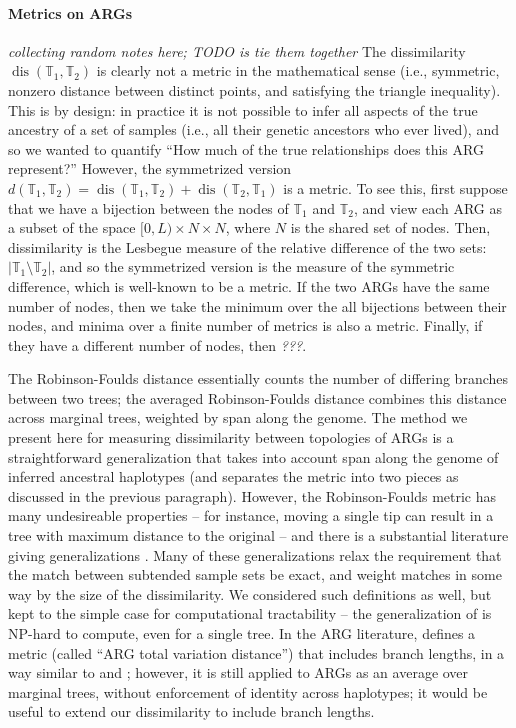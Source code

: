 \documentclass[10pt,twoside,lineno]{gsajnl}
\newcommand{\T}{\mathbb{T}}
\newcommand{\dis}{\operatorname{dis}}
\newcommand{\comment}[1]{{\color{violet} \it #1}}
\begin{document}
\paragraph{Metrics on ARGs}
\comment{collecting random notes here; TODO is tie them together}
The dissimilarity $\dis(\T_1,\T_2)$ is clearly not a metric in the mathematical sense
(i.e., symmetric, nonzero distance between distinct points, and satisfying the triangle inequality).
This is by design: in practice it is not possible to infer all aspects
of the true ancestry of a set of samples (i.e., all their genetic ancestors who ever lived),
and so we wanted to quantify
``How much of the true relationships does this ARG represent?''
However, the symmetrized version
$d(\T_1,\T_2) = \dis(\T_1,\T_2) + \dis(\T_2, \T_1)$ is a metric.
To see this, first suppose that we have a bijection between the nodes of $\T_1$ and $\T_2$,
and view each ARG as a subset of the space $[0,L) \times N \times N$,
where $N$ is the shared set of nodes.
Then, dissimilarity is the Lesbegue measure of the relative difference of the two sets:
$|\T_1 \setminus \T_2|$,
and so the symmetrized version is the measure of the symmetric difference,
which is well-known to be a metric.
If the two ARGs have the same number of nodes,
then we take the minimum over the all bijections between their nodes,
and minima over a finite number of metrics is also a metric.
Finally, if they have a different number of nodes,
then \comment{???}.

The Robinson-Foulds distance \citep{robinson1981comparison}
essentially counts the number of differing branches between two trees;
the averaged Robinson-Foulds distance \citep{kelleher2019inferring} %
combines this distance across marginal trees, weighted by span along the genome.
The method we present here for measuring dissimilarity between topologies of ARGs
is a straightforward generalization
that takes into account span along the genome of inferred ancestral haplotypes
(and separates the metric into two pieces as discussed in the previous paragraph).
However, the Robinson-Foulds metric has many undesireable properties --
for instance, moving a single tip can result in a tree with maximum distance to the original --
and there is a substantial literature giving generalizations
\citep[reviewed by][]{llabres2021generalized}.
Many of these generalizations \citep[e.g.,][]{bocker2013generalized}
relax the requirement that the match between subtended sample sets be exact,
and weight matches in some way by the size of the dissimilarity.
We considered such definitions as well, but kept to the simple case
for computational tractability --
the generalization of \citet{bocker2013generalized} is NP-hard to compute, even for a single tree.
In the ARG literature, \citet{zhang2023biobankscale}
defines a metric (called ``ARG total variation distance'') that includes branch lengths,
in a way similar to \citet{robinson1979comparison} and \citet{kuhner1994simulation};
however, it is still applied to ARGs as an average over marginal trees,
without enforcement of identity across haplotypes;
it would be useful to extend our dissimilarity to include branch lengths.
\end{document}
